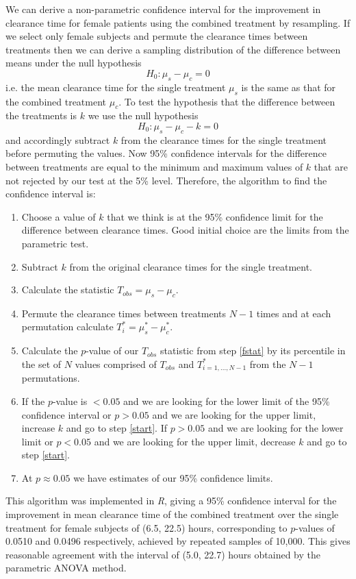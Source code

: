 We can derive a non-parametric confidence interval for the improvement in clearance time for female patients using the combined treatment by resampling. If we select only female subjects and permute the clearance times between treatments then we can derive a sampling distribution of the difference between means under the null hypothesis
$$H_{0}:\mu_{s}-\mu_{c}=0$$
i.e. the mean clearance time for the single treatment $\mu_{s}$ is the same as that for the combined treatment $\mu_{c}$. To test the hypothesis that the difference between the treatments is $k$ we use the null hypothesis
$$H_{0}:\mu_{s}-\mu_{c}-k=0$$
and accordingly subtract $k$ from the clearance times for the single treatment before permuting the values. Now 95\% confidence intervals for the difference between treatments are equal to the minimum and maximum values of $k$ that are not rejected by our test at the 5\% level. Therefore, the algorithm to find the confidence interval is:
\begin{enumerate}
\item Choose a value of $k$ that we think is at the 95\% confidence limit for the difference between clearance times. Good initial choice are the limits from the parametric test.
\item Subtract $k$ from the original clearance times for the single treatment.\label{start}
\item Calculate the statistic $T_{obs}=\mu_{s}-\mu_{c}$.\label{fstat}
\item Permute the clearance times between treatments $N-1$ times and at each permutation calculate $T^{*}_{i}=\mu_{s}^{*}-\mu_{c}^{*}$.
\item Calculate the $p$-value of our $T_{obs}$ statistic from step \ref{fstat} by its percentile in the set of $N$ values comprised of $T_{obs}$ and $T_{i=1,...,N-1}^{*}$ from the $N-1$ permutations.
\item If the $p$-value is $<0.05$ and we are looking for the lower limit of the 95\% confidence interval or $p>0.05$ and we are looking for the upper limit, increase $k$ and go to step \ref{start}. If $p>0.05$ and we are looking for the lower limit or $p<0.05$ and we are looking for the upper limit, decrease $k$ and go to step \ref{start}.
\item At $p\approx 0.05$ we have estimates of our 95\% confidence limits.
\end{enumerate}
This algorithm was implemented in \emph{R}, giving a 95\% confidence interval for the improvement in mean clearance time of the combined treatment over the single treatment for female subjects of (6.5, 22.5) hours, corresponding to $p$-values of 0.0510 and 0.0496 respectively, achieved by repeated samples of 10,000. This gives reasonable agreement with the interval of (5.0, 22.7) hours obtained by the parametric ANOVA method.

